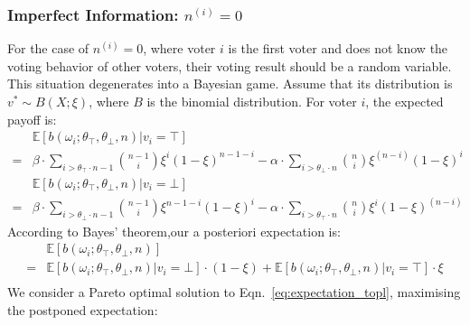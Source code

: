 \documentclass[11pt]{article}
\begin{document}
  \subsubsection{Imperfect Information: $n^{(i)}=0$}
  \label{sec:imperfect_information}
  For the case of $n^{(i)}=0$, where voter $i$ is the first voter and does not know the voting behavior of other voters, their voting result should be a random variable. This situation degenerates into a Bayesian game.
  Assume that its distribution is $v^*\sim B(X;\xi)$, where $B$ is the binomial distribution. For voter $i$, the expected payoff is:
  \begin{equation}
    \label{eq:expectation_top}
    \begin{aligned}
      &\mathbb{E}[b(\omega_i;\theta_\top,\theta_\bot,n )| v_i=\top]\\ 
      = &\beta\cdot\sum_{i>\theta_\top\cdot n-1}{\binom{n-1}{i}\xi^i(1-\xi)^{n-1-i}} - \alpha\cdot\sum_{i>\theta_\bot\cdot n}{\binom{n}{i}\xi^{(n-i)}(1-\xi)^{i}}
    \end{aligned}
  \end{equation}
  \begin{equation}
    \label{eq:expectation_bot}
    \begin{aligned}
      &\mathbb{E}[b(\omega_i;\theta_\top,\theta_\bot,n )| v_i=\bot]\\
       =& \beta\cdot\sum_{i>\theta_\bot\cdot n-1}{\binom{n-1}{i}\xi^{n-1-i}(1-\xi)^i}- \alpha\cdot\sum_{i>\theta_\top\cdot n}{\binom{n}{i}\xi^{i}(1-\xi)^{(n-i)}}
    \end{aligned}
  \end{equation}
  According to Bayes' theorem,our a posteriori expectation is:
  \begin{equation}
    \label{eq:expectation_topl}
    \begin{aligned}
      &\mathbb{E}[b(\omega_i;\theta_\top,\theta_\bot,n)] \\
      = &\mathbb{E}[b(\omega_i;\theta_\top,\theta_\bot,n )| v_i=\bot]\cdot (1-\xi)+ \mathbb{E}[b(\omega_i;\theta_\top,\theta_\bot,n )| v_i=\top]\cdot \xi\\
    \end{aligned}
  \end{equation}
  We consider a Pareto optimal solution to Eqn.~\ref{eq:expectation_topl}, maximising the postponed expectation:
\end{document}
